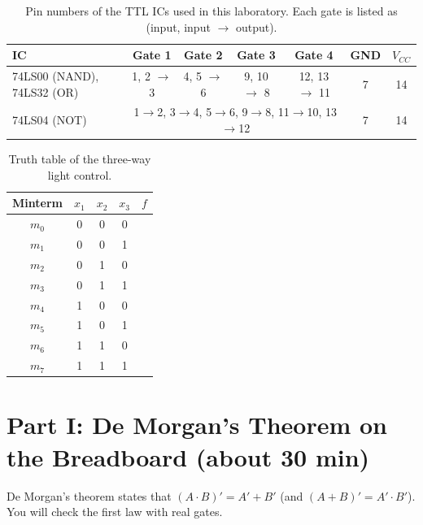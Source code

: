 \documentclass{article}
\begin{document}
\begin{table}[H]
    \centering
    \begin{tabular}{|l|c|c|c|c|c|c|}
        \hline
        \textbf{IC} & \textbf{Gate 1} & \textbf{Gate 2} & \textbf{Gate 3} & \textbf{Gate 4} & \textbf{GND} & \textbf{$V_{CC}$} \\
        \hline
        74LS00 (NAND), 74LS32 (OR) & 1, 2 $\rightarrow$ 3 & 4, 5 $\rightarrow$ 6 & 9, 10 $\rightarrow$ 8 & 12, 13 $\rightarrow$ 11 & 7 & 14 \\
        \hline
        74LS04 (NOT) & \multicolumn{4}{c|}{1$\rightarrow$2, 3$\rightarrow$4, 5$\rightarrow$6, 9$\rightarrow$8, 11$\rightarrow$10, 13$\rightarrow$12} & 7 & 14 \\
        \hline
    \end{tabular}
    \caption{Pin numbers of the TTL ICs used in this laboratory. Each gate is listed as (input, input $\rightarrow$ output).}
    \label{tab:pinout}
\end{table}

\begin{table}[H]
    \centering
    \begin{tabular}{|c|c|c|c|c|}
        \hline
        \textbf{Minterm} & $x_1$ & $x_2$ & $x_3$ & $f$ \\
        \hline
        $m_0$ & 0 & 0 & 0 & \\
        $m_1$ & 0 & 0 & 1 & \\
        $m_2$ & 0 & 1 & 0 & \\
        $m_3$ & 0 & 1 & 1 & \\
        $m_4$ & 1 & 0 & 0 & \\
        $m_5$ & 1 & 0 & 1 & \\
        $m_6$ & 1 & 1 & 0 & \\
        $m_7$ & 1 & 1 & 1 & \\
        \hline
    \end{tabular}
    \caption{Truth table of the three-way light control.}
    \label{tab:three_way}
\end{table}

\section*{Part I: De Morgan's Theorem on the Breadboard (about 30 min)}

De Morgan's theorem states that $(A\cdot B)' = A' + B'$ (and $(A+B)' = A'\cdot B'$). You will check the first law with real gates.
\end{document}
